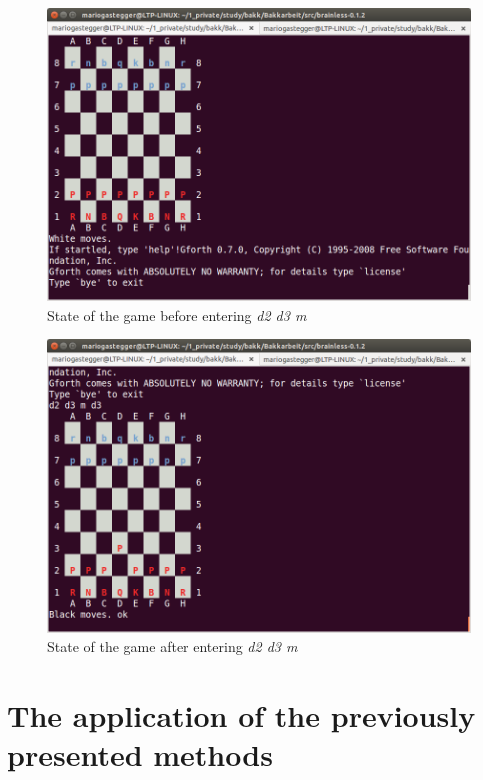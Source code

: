 \begin{figure}[p]
    \centering
    \includegraphics[scale=0.4]{graphics/brainless_before.png}
    \caption{State of the game before entering \emph{d2 d3 m}}
    \label{fig:brainless_before_m}
\end{figure}

\begin{figure}[p]
    \centering
    \includegraphics[scale=0.4]{graphics/brainless_after.png}
    \caption{State of the game after entering \emph{d2 d3 m}}
    \label{fig:brainless_after_m}
\end{figure}

\section{The application of the previously presented methods}

